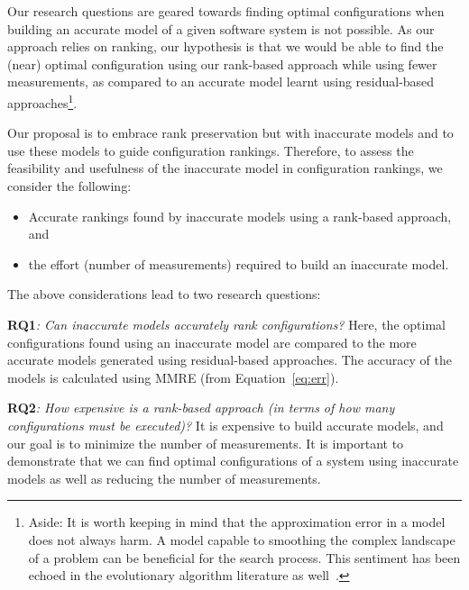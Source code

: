 \documentclass[sigconf]{acmart}
\begin{document}
Our research questions are geared towards finding optimal configurations when building an accurate model of a given software system is not possible. As our approach relies on ranking, our hypothesis is that we would be able to find the (near) optimal configuration  using our rank-based approach while using fewer measurements, as compared to an accurate model learnt using  residual-based approaches\footnote{Aside: It is worth keeping in mind that the approximation error in a model does not always harm. A model capable to smoothing the complex landscape of a problem can be beneficial for the search process. This sentiment has been echoed in the evolutionary algorithm literature as well~\cite{lim2010generalizing}.}.

Our proposal is to embrace rank preservation but with inaccurate models and to use these models to guide configuration rankings. Therefore, to assess the feasibility and usefulness of the inaccurate model in configuration rankings, we consider the following:
\begin{itemize}
    \item Accurate rankings found by inaccurate models using a rank-based approach, and
    \item the effort (number of measurements) required to build an inaccurate model. 
\end{itemize}
The above considerations lead to  two research questions:

 
  
 
\textbf{RQ1}\textit{: Can  inaccurate    models accurately rank
configurations?}
Here, the optimal configurations found using an inaccurate model are compared to the more accurate models generated using residual-based approaches. The accuracy of the models is calculated using MMRE (from Equation~\ref{eq:err}). 


\textbf{RQ2}\textit{: How expensive is a rank-based approach (in terms of
 how many configurations must be executed)?}
It is expensive to build accurate models, and our goal is to minimize the number of measurements. It is important to demonstrate that we can find optimal configurations of a system using inaccurate models as well as reducing the number of measurements.
\end{document}
